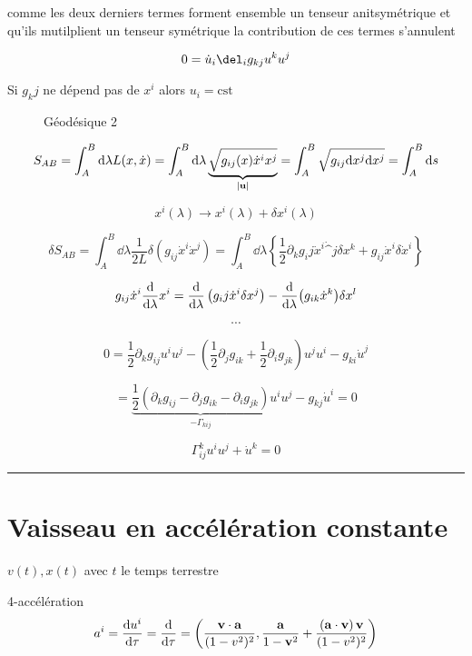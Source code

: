 comme les deux derniers termes forment ensemble un tenseur anitsymétrique et qu'ils mutilplient un tenseur symétrique la contribution de ces termes s'annulent 


$$0 = \dot u_i \del_i g_{kj} u^k u^j$$ 

Si $g_kj$ ne dépend pas de $x^{i}$ alors $u_i = \text{cst} $    



\begin{figure}[ht]
    \centering
    \caption{Géodésique 2}
    \label{fig:géodésique-2}
\end{figure}


$$S_{AB} = \int_{A}^{B}\dd \lambda L(x, \dot x) = \int_{A}^{B}\dd \lambda \underbrace{\sqrt{g_{ij} (x)\dot x^{i}x^{j}}}_{\abs{\vb{u}} }  = \int_{A}^{B} \sqrt{g_{ij} \dd x^{j} \dd x^{j}}= \int_{A}^{B}\dd s$$ 


$$x^{i}(\lambda) \to x^{i}(\lambda) + \delta x^{i}(\lambda) $$ 

$$\delta S_{AB} = \int_{A}^{B}\dd \lambda \frac{1}{2L} \delta(g_{ij} \dot x^{i}\dot x^{j}) = \int_{A}^{B}\dd \lambda \left\{ \frac{1}{2} \partial_k g_ij \dot x^{i}\dot^{j}\delta x^{k} + g_{ij} \dot x^{i} \delta \dot x^{i}\right\} $$ 

\begin{tcolorbox}[title=]
	$$g_{ij} \dot x^{i}\dv{{}}{\lambda} x^{i}=  \dv{{}}{\lambda} \left( g_ij \dot x^{i}\delta x^j \right) - \dv{{}}{\lambda} \qty(g_{ik} \dot x^{k}) \delta x^l$$ 
\end{tcolorbox}

$$\dotsb$$ 


$$0 = \frac{1}{2} \partial_k g_{ij} u^{i}u^{j}-\left( \frac{1}{2} \partial_j g_{ik} + \frac{1}{2} \partial_i g_{jk}   \right)u^{j}u^{i} - g_{ki} \dot u^j $$ 

$$=  \underbrace{\frac{1}{2}\left( \partial_k g_{ij} - \partial_j g_{ik} - \partial_i g_{jk}  \right)}_{-\Gamma_{kij} } u^{i}u^{j}- g_{kj} \dot u^{i}= 0$$ 


$$\boxed{\Gamma_{ij}^{k}u^{i}u^{j}+ \dot u^{k} =0}$$ 

\hrule

\section*{Vaisseau en accélération constante}

 $v(t), x(t)$ avec $t$ le temps terrestre  

4-accélération $$a^{i}= \dv{u^{i}}{\tau} = \dv{{}}{\tau} (\gamma, \gamma \vb{v}) = \left( \frac{\vb{v} \cdot \vb{a}}{(1-v^2)^2}, \frac{\vb{a}}{1-\vb{v}^2} + \frac{\left( \vb{a} \cdot  \vb{v} \right) \vb{v}}{(1-v^{2})^2}    \right) $$ 


